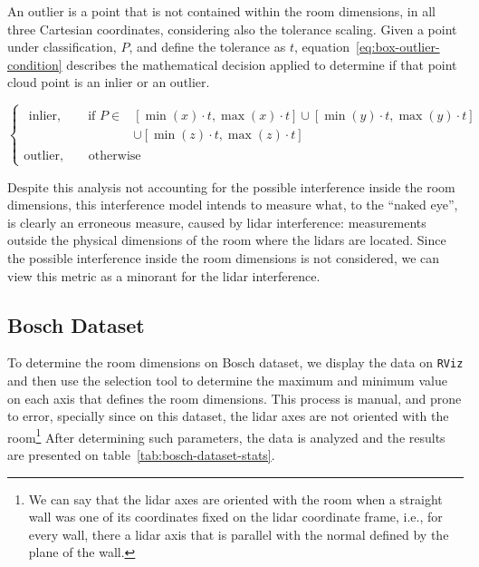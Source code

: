 An outlier is a point that is not contained within the room dimensions, in all three Cartesian coordinates, considering also the tolerance scaling. Given a point under classification, $P$, and define the tolerance as $t$, equation~\ref{eq:box-outlier-condition} describes the mathematical decision applied to determine if that point cloud point is an inlier or an outlier.

\begin{equation}
\label{eq:box-outlier-condition}
\begin{cases}
	\begin{aligned}
		\text{inlier}, \qquad \text{if\ } P \in & [\min(x) \cdot t, \max(x) \cdot t] \cup [\min(y) \cdot t, \max(y) \cdot t]  \\
																					&					 \cup [\min(z) \cdot t, \max(z) \cdot t] 
	\end{aligned} \\
	\text{outlier}, \qquad \text{otherwise}
\end{cases}
\end{equation}

Despite this analysis not accounting for the possible interference inside the room dimensions, this interference model intends to measure what, to the ``naked eye'', is clearly an erroneous measure, caused by \ac{lidar} interference: measurements outside the physical dimensions of the room where the \acp{lidar} are located. Since the possible interference inside the room dimensions is not considered, we can view this metric as a minorant for the \ac{lidar} interference.


\subsection{Bosch Dataset}
\label{subsec:lidar-interference:room-outliers-bosch}
To determine the room dimensions on Bosch dataset, we display the data on \texttt{RViz} and then use the selection tool to determine the maximum and minimum value on each axis that defines the room dimensions. This process is manual, and prone to error, specially since on this dataset, the \ac{lidar} axes are not oriented with the room\footnote{We can say that the \ac{lidar} axes are oriented with the room when a straight wall was one of its coordinates fixed on the \ac{lidar} coordinate frame, i.e., for every wall, there a \ac{lidar} axis that is parallel with the normal defined by the plane of the wall.} After determining such parameters, the data is analyzed and the results are presented on table~\ref{tab:bosch-dataset-stats}.


